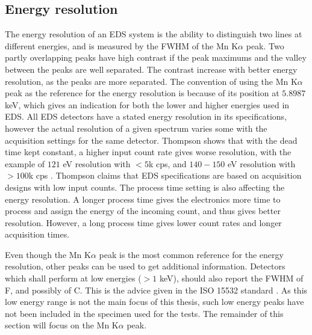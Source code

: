\subsection{Energy resolution}
\label{theory:eds_performance:energyres}


The energy resolution of an EDS system is the ability to distinguish two lines at different energies, and is measured by the FWHM of the Mn K$\alpha$ peak.
Two partly overlapping peaks have high contrast if the peak maximums and the valley between the peaks are well separated.
The contrast increase with better energy resolution, as the peaks are more separated.
The convention of using the Mn K$\alpha$ peak as the reference for the energy resolution is because of its position at $5.8987$ keV, which gives an indication for both the lower and higher energies used in EDS.
All EDS detectors have a stated energy resolution in its specifications, however the actual resolution of a given spectrum varies some with the acquisition settings for the same detector.
Thompson shows that with the dead time kept constant, a higher input count rate gives worse resolution, with the example of $121$ eV resolution with $<5$k cps, and $140-150$ eV resolution with $>100$k cps \cite{keith_energy_res_2013}.
Thompson claims that EDS specifications are based on acquisition designs with low input counts.
The process time setting is also affecting the energy resolution.
A longer process time gives the electronics more time to process and assign the energy of the incoming count, and thus gives better resolution.
However, a long process time gives lower count rates and longer acquisition times.


Even though the Mn K$\alpha$ peak is the most common reference for the energy resolution, other peaks can be used to get additional information.
Detectors which shall perform at low energies ($>1$ keV), should also report the FWHM of F, and possibly of C.
This is the advice given in the ISO 15532 standard \cite{iso_qc_15632}.
As this low energy range is not the main focus of this thesis, such low energy peaks have not been included in the specimen used for the tests.
The remainder of this section will focus on the Mn K$\alpha$ peak.



